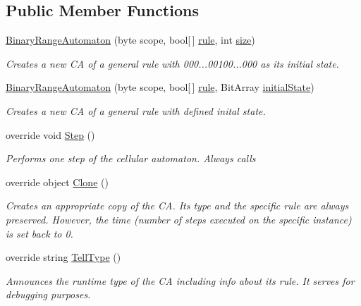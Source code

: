 \subsection*{Public Member Functions}
\begin{DoxyCompactItemize}
\item 
\hyperlink{class_cellular_1_1_binary_range_automaton_a3b165a9e98e516bf7e9bdb8bb2fe16a7}{Binary\+Range\+Automaton} (byte scope, bool\mbox{[}$\,$\mbox{]} \hyperlink{class_cellular_1_1_binary_range_automaton_a4dda99c3151599c8ef12d08d7472144c}{rule}, int \hyperlink{class_cellular_1_1_automaton1_d_a915129ccf0f1e7092844c99ce6a28e5b}{size})
\begin{DoxyCompactList}\small\item\em Creates a new C\+A of a general rule with 000...00100...000 as its initial state. \end{DoxyCompactList}\item 
\hyperlink{class_cellular_1_1_binary_range_automaton_a704950c30ff58c587c8a717f9f2c839b}{Binary\+Range\+Automaton} (byte scope, bool\mbox{[}$\,$\mbox{]} \hyperlink{class_cellular_1_1_binary_range_automaton_a4dda99c3151599c8ef12d08d7472144c}{rule}, Bit\+Array \hyperlink{all__1_8js_ae8b87ff4be2ae1dd5267342795263360}{initial\+State})
\begin{DoxyCompactList}\small\item\em Creates a new C\+A of a general rule with defined inital state. \end{DoxyCompactList}\item 
override void \hyperlink{class_cellular_1_1_binary_range_automaton_ade1f5b831b9676f04f835c33d245b9e2}{Step} ()
\begin{DoxyCompactList}\small\item\em Performs one step of the cellular automaton. Always calls \end{DoxyCompactList}\item 
override object \hyperlink{class_cellular_1_1_binary_range_automaton_a12f010562e04785e0a7efb113302687e}{Clone} ()
\begin{DoxyCompactList}\small\item\em Creates an appropriate copy of the C\+A. Its type and the specific rule are always preserved. However, the time (number of steps executed on the specific instance) is set back to 0. \end{DoxyCompactList}\item 
override string \hyperlink{class_cellular_1_1_binary_range_automaton_afad205eb4fea51efd63b063f96bfda5c}{Tell\+Type} ()
\begin{DoxyCompactList}\small\item\em Announces the runtime type of the C\+A including info about its rule. It serves for debugging purposes. \end{DoxyCompactList}\end{DoxyCompactItemize}
